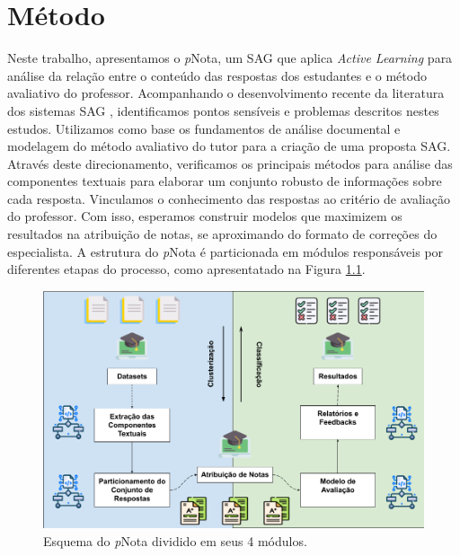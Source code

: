 \chapter{Método}
\label{cap-metodo}

Neste trabalho, apresentamos o \textit{p}Nota, um SAG que aplica \textit{Active Learning} para análise da relação entre o conteúdo das respostas dos estudantes e o método avaliativo do professor. Acompanhando o desenvolvimento recente da literatura dos sistemas SAG \cite{burrows2015, bonthu2021, haller2022}, identificamos pontos sensíveis e problemas descritos nestes estudos. Utilizamos como base os fundamentos de análise documental e modelagem do método avaliativo do tutor para a criação de uma proposta SAG. Através deste direcionamento, verificamos os principais métodos para análise das componentes textuais para elaborar um conjunto robusto de informações sobre cada resposta. Vinculamos o conhecimento das respostas ao critério de avaliação do professor. Com isso, esperamos construir modelos que maximizem os resultados na atribuição de notas, se aproximando do formato de correções do especialista. A estrutura do \textit{p}Nota é particionada em módulos responsáveis por diferentes etapas do processo, como apresentatado na Figura \ref{fig-esquema}.

\begin{figure}[!h]
\centering
\includegraphics[width=\textwidth]{figuras/estrutura-pNota.png}
\caption{Esquema do \textit{p}Nota dividido em seus 4 módulos.}
\label{fig-esquema}
\end{figure}


